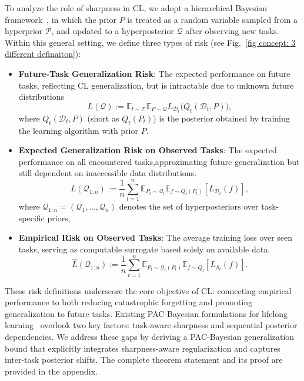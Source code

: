 \documentclass[letterpaper]{article} %
\begin{document}
To analyze the role of sharpness in CL, we adopt a hierarchical Bayesian framework~\cite{pentinaPACBayesianBoundLifelong2014}, in which the prior $P$ is treated as a random variable sampled from a hyperprior $\mathcal{P}$, and updated to a hyperposterior 
$\mathcal{Q}$ after observing new tasks. Within this general setting, we define three types of risk (see Fig.~\ref{fig concept: 3 different definaiton}):


\begin{itemize}
    \item \textbf{Future-Task Generalization Risk}: The expected performance on future tasks, reflecting CL generalization, but is intractable due to unknown future distributions \[ L(\mathcal{Q}) := \mathbb{E}_{t \sim \mathcal{T}}\mathbb{E}_{P \sim \mathcal{Q}}L_{\mathcal{D}_t}\big(Q_t(\mathcal{D}_t, P)\big),
    \] where $Q_t(\mathcal{D}_t, P )$ (short as $Q_t(P_t)$) is the posterior obtained by training the learning algorithm with prior $P$.
    \item \textbf{Expected Generalization Risk on Observed Tasks}: The expected performance on all encountered tasks,approximating future generalization but still dependent on inaccessible data distributions.
    $$
        L(\mathcal{Q}_{1:n}) := \frac{1}{n} \sum_{t=1}^n \mathbb{E}_{P_{t} \sim \mathcal{Q}_{t}} \mathbb{E}_{f \sim Q_t(P_t)} [ L_{\mathcal{D}_t}(f) ],
    $$ where $\mathcal{Q}_{1:n} = (\mathcal{Q}_1, \ldots, \mathcal{Q}_n)$ denotes the set of hyperposteriors over task-specific priors, 
   
    \item \textbf{Empirical Risk on Observed Tasks}: The average training loss over seen tasks, serving as computable surrogate based solely on available data.
    $$
        \hat{L}(\mathcal{Q}_{1:n}) := \frac{1}{n} \sum_{t=1}^n \mathbb{E}_{P_t \sim \mathcal{Q}_t(P_t)} \mathbb{E}_{f \sim Q_t}  [ L_{\mathcal{S}_t}(f) ].
    $$
\end{itemize}




These risk definitions underscore the core objective of CL: connecting  empirical performance to both reducing catastrophic forgetting and promoting generalization to future tasks. Existing PAC-Bayesian formulations for lifelong learning~\cite{pentinaPACBayesianBoundLifelong2014} overlook two key factors: task-aware sharpness and sequential posterior dependencies. We address these gaps by deriving a PAC-Bayesian generalization bound that explicitly integrates sharpness-aware regularization and captures inter-task posterior shifts. The complete theorem statement and its proof are provided in the appendix.
\end{document}
